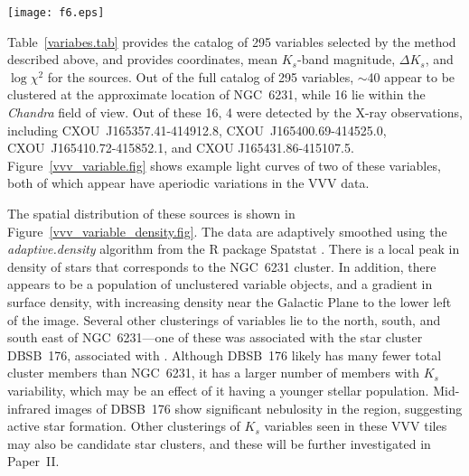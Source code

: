 \documentclass[twocolumn,tighten]{aastex61}
\begin{document}
\begin{figure*}[t]
\centering
\texttt{[image: f6.eps]} 
\caption{The spatial distribution of $K_s$ variable stars (black circles) in the VVV tiles ``d148'' and ``d110.'' A smoothed surface density map of these objects is shown using the color scale. The map shows that some $K_s$ variables are associated with clusters like NGC~6231, while others are distributed in the field. A gradient in surface density increases toward the Galactic Plane (lower left). The field of view of the tiles and the field of view of {\it Chandra} are outlined in black, and the four $K_s$ variables with X-ray counterparts are highlighted in yellow. Known clusters within the field of view are indicated.  
 \label{vvv_variable_density.fig}}
\end{figure*}


Table~\ref{variabes.tab} provides the catalog of 295 variables selected by the method described above, and provides coordinates, mean $K_s$-band magnitude, $\Delta K_s$, and $\log \chi^2$ for the sources. Out of the full catalog of 295 variables, $\sim$40 appear to be clustered at the approximate location of NGC~6231, while 16 lie within the {\it Chandra} field of view. Out of these 16, 4 were detected by the X-ray observations, including CXOU~J165357.41-414912.8, CXOU~J165400.69-414525.0, CXOU~J165410.72-415852.1, and CXOU J165431.86-415107.5. Figure~\ref{vvv_variable.fig} shows example light curves of two of these variables, both of which appear have aperiodic variations in the VVV data. 



The spatial distribution of these sources is shown in Figure~\ref{vvv_variable_density.fig}. The data are adaptively smoothed using the {\it adaptive.density} algorithm from the R package Spatstat \citep{baddeley2005spatstat}. There is a local peak in density of stars that corresponds to the NGC~6231 cluster. In addition, there appears to be a population of unclustered variable objects, and a gradient in surface density, with increasing density near the Galactic Plane to the lower left of the image. Several other clusterings of variables lie to the north, south, and south east of NGC~6231---one of these was associated with the star cluster  DBSB~176, associated with  \citep{2007ApJ...659.1360W,2016A&A...585A.101K}. Although DBSB~176 likely has many fewer total cluster members than NGC~6231, it has a larger number of members with $K_s$ variability, which may be an effect of it having a younger stellar population. Mid-infrared images of DBSB~176 show significant nebulosity in the region, suggesting active star formation. Other clusterings of $K_s$ variables seen in these VVV tiles may also be candidate star clusters, and these will be further investigated in Paper~II. 
\end{document}
